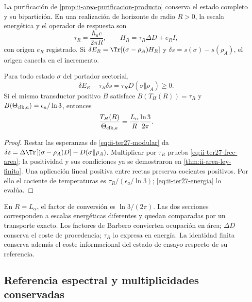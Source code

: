 La purificación de \ref{prop:ii-area-purificacion-producto} conserva el
estado completo y su bipartición. En una realización de horizonte de radio
$R>0$, la escala energética y el operador de respuesta son
\begin{equation}
 \tau_R=\frac{\hbar_ac}{2\pi R},\qquad
 H_R=\tau_R\Delta D+e_RI,
 \label{eq:ii-ter27-response}
\end{equation}
con origen $e_R$ registrado. Si $\delta E_R=\Tr[(\sigma-\rho_A)H_R]$
y $\delta s=s(\sigma)-s(\rho_A)$, el origen cancela en el incremento.

\begin{theorem}
\label{thm:ii-ter27-horizon}
Para todo estado $\sigma$ del portador sectorial,
\begin{equation}
 \delta E_R-\tau_R\delta s
 =\tau_R D(\sigma\Vert\rho_A)\ge0.
 \label{eq:ii-ter27-free-area}
\end{equation}
Si el mismo transductor positivo $B$ satisface
$B(T_H(R))=\tau_R$ y
$B(\Theta_{{\rm clk},a})=\epsilon_a/\ln3$, entonces
\begin{equation}
 \frac{T_H(R)}{\Theta_{{\rm clk},a}}
 =\frac{L_\alpha}{R}\frac{\ln3}{2\pi}.
 \label{eq:ii-ter27-clock-horizon}
\end{equation}
\end{theorem}
\begin{proof}
Restar las esperanzas de \eqref{eq:ii-ter27-modular} da
$\delta s=\Delta\Tr[(\sigma-\rho_A)D]-D(\sigma\Vert\rho_A)$.
Multiplicar por $\tau_R$ prueba \eqref{eq:ii-ter27-free-area}; la
positividad y sus condiciones ya se demostraron en
\ref{thm:ii-area-ley-finita}. Una aplicación lineal positiva entre rectas
preserva cocientes positivos. Por ello el cociente de temperaturas es
$\tau_R/(\epsilon_a/\ln3)$; \eqref{eq:ii-ter27-energia} lo evalúa.
\end{proof}

En $R=L_\alpha$, el factor de conversión es $\ln3/(2\pi)$.
Las dos secciones corresponden a escalas energéticas diferentes y quedan
comparadas por un transporte exacto. Los factores de Barbero convierten
ocupación en área; $\Delta D$ conserva el coste de procedencia; $\tau_R$
lo expresa en energía. La identidad finita conserva además el coste
informacional del estado de ensayo respecto de su referencia.

\subsection{Referencia espectral y multiplicidades conservadas}
\label{subsec:ii-ter27-reference}

